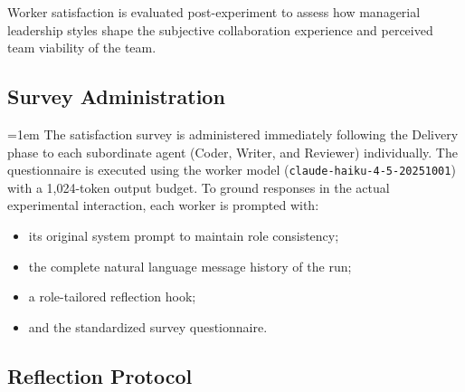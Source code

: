 Worker satisfaction is evaluated post-experiment to assess how managerial leadership styles shape the subjective collaboration experience and perceived team viability of the team.

\subsection{Survey Administration}
\label{subsec:survey-administration}

{
\emergencystretch=1em
The satisfaction survey is administered immediately following the Delivery phase to each subordinate agent (Coder, Writer, and Reviewer) individually.
The questionnaire is executed using the worker model (\texttt{claude-haiku-4-5-20251001}) with a 1,024-token output budget.
To ground responses in the actual experimental interaction, each worker is prompted with:
\begin{itemize}
    \item its original system prompt to maintain role consistency;
    \item the complete natural language message history of the run;
    \item a role-tailored reflection hook;
    \item and the standardized survey questionnaire.
\end{itemize}
\par}

\subsection{Reflection Protocol}
\label{subsec:reflection-protocol}


